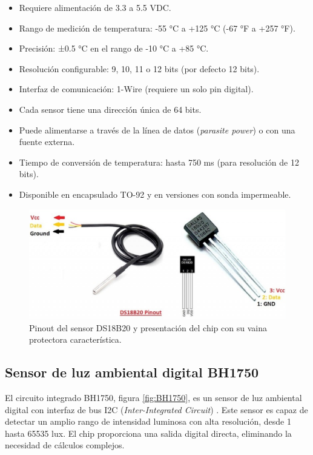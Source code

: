 \begin{itemize}
	\item Requiere alimentación de 3.3 a 5.5 VDC.
	\item Rango de medición de temperatura: -55 °C a +125 °C (-67 °F a +257 °F).
	\item Precisión: ±0.5 °C en el rango de -10 °C a +85 °C.
	\item Resolución configurable: 9, 10, 11 o 12 bits (por defecto 12 bits).
	\item Interfaz de comunicación: 1-Wire (requiere un solo pin digital).
	\item Cada sensor tiene una dirección única de 64 bits.
	\item Puede alimentarse a través de la línea de datos (\textit{parasite power}) o con una fuente externa.
	\item Tiempo de conversión de temperatura: hasta 750 ms (para resolución de 12 bits).
	\item Disponible en encapsulado TO-92 y en versiones con sonda impermeable.
\end{itemize}


\begin{figure}[h]
\centering
\includegraphics[scale=.5]{./Figures/ds18b20.png}
	\caption{Pinout del sensor DS18B20 y presentación del chip con su vaina protectora característica.}
	\label{fig:ds18b20}
\end{figure}


\subsection{Sensor de luz ambiental digital BH1750}

El circuito integrado BH1750, figura \ref{fig:BH1750}, es un sensor de luz ambiental digital con interfaz de bus I2C (\textit{Inter-Integrated Circuit}) \cite{BH1750}. Este sensor es capaz de detectar un amplio rango de intensidad luminosa con alta resolución, desde 1 hasta 65535 lux. El chip proporciona una salida digital directa, eliminando la necesidad de cálculos complejos.

